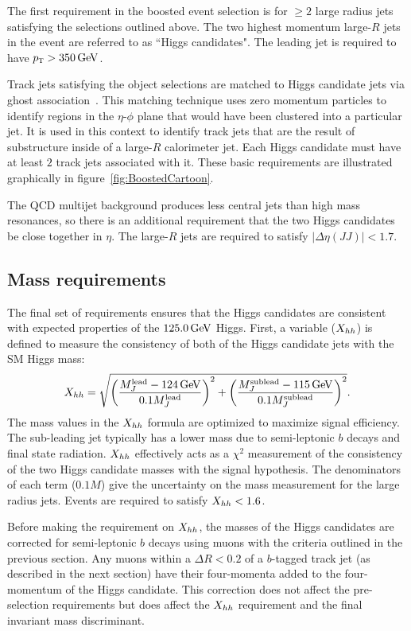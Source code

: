 The first requirement in the boosted event selection is for $\geq 2$ large radius jets satisfying the selections outlined above. The two highest momentum large-$R$ jets in the event are referred to as ``Higgs candidates". The leading jet is required to have $\pT > 350 \GeV$. 

Track jets satisfying the object selections are matched to Higgs candidate jets via ghost association~\cite{GhostAssociation}. This matching technique uses zero momentum particles to identify regions in the $\eta$-$\phi$ plane that would have been clustered into a particular jet. It is used in this context to identify track jets that are the result of substructure inside of a large-$R$ calorimeter jet. Each Higgs candidate must have at least $2$ track jets associated with it. These basic requirements are illustrated graphically in figure~\ref{fig:BoostedCartoon}.

The QCD multijet background produces less central jets than high mass resonances, so there is an additional requirement that the two Higgs candidates be close together in $\eta$. The large-$R$ jets are required to satisfy $|\Delta\eta(JJ)| < 1.7$. 

\subsection{Mass requirements}

The final set of requirements ensures that the Higgs candidates are consistent with expected properties of the $125.0 \GeV$ Higgs. First, a variable ($X_{hh}$) is defined to measure the consistency of both of the Higgs candidate jets with the SM Higgs mass:
%
\begin{equation}
\label{eqn:Xhh}
\Xhh = \sqrt{\left(\frac{M_J^{\rm lead} - 124 \GeV}{0.1 M_J^{\rm lead}}\right)^2 + \left(\frac{M_J^{\rm sublead} - 115 \GeV}{0.1 M_J^{\rm sublead}}\right)^2}.
\end{equation}
%
The mass values in the $X_{hh}$ formula are optimized to maximize signal efficiency. The sub-leading jet typically has a lower mass due to semi-leptonic $b$ decays and final state radiation. $X_{hh}$ effectively acts as a $\chi^2$ measurement of the consistency of the two Higgs candidate masses with the signal hypothesis. The denominators of each term ($0.1M$) give the uncertainty on the mass measurement for the large radius jets. Events are required to satisfy $X_{hh} < 1.6$. 

Before making the requirement on $X_{hh}$, the masses of the Higgs candidates are corrected for semi-leptonic $b$ decays using muons with the criteria outlined in the previous section. Any muons within a $\Delta R < 0.2$ of a $b$-tagged track jet (as described in the next section) have their four-momenta added to the four-momentum of the Higgs candidate. This correction does not affect the pre-selection requirements but does affect the $X_{hh}$ requirement and the final invariant mass discriminant. 

